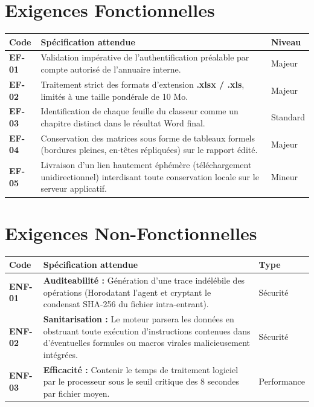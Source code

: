 \documentclass[12pt,a4paper,oneside]{report}
\begin{document}
\section{Exigences Fonctionnelles}

\begin{table}[H]
\centering
\begin{tabular}{L{2cm} L{10cm} L{2cm}}
\toprule
\textbf{Code} & \textbf{Spécification attendue} & \textbf{Niveau} \\
\midrule
\textbf{EF-01} & Validation impérative de l'authentification préalable par compte autorisé de l'annuaire interne. & Majeur \\
\textbf{EF-02} & Traitement strict des formats d'extension \textbf{.xlsx / .xls}, limités à une taille pondérale de 10 Mo. & Majeur \\
\textbf{EF-03} & Identification de chaque feuille du classeur comme un chapitre distinct dans le résultat Word final. & Standard \\
\textbf{EF-04} & Conservation des matrices sous forme de tableaux formels (bordures pleines, en-têtes répliquées) sur le rapport édité. & Majeur \\
\textbf{EF-05} & Livraison d'un lien hautement éphémère (téléchargement unidirectionnel) interdisant toute conservation locale sur le serveur applicatif. & Mineur \\
\bottomrule
\end{tabular}
\end{table}

\section{Exigences Non-Fonctionnelles}

\begin{table}[H]
\centering
\begin{tabular}{L{2cm} L{10cm} L{2cm}}
\toprule
\textbf{Code} & \textbf{Spécification attendue} & \textbf{Type} \\
\midrule
\textbf{ENF-01} & \textbf{Auditeabilité : } Génération d'une trace indélébile des opérations (Horodatant l'agent et cryptant le condensat SHA-256 du fichier intra-entrant). & Sécurité \\
\textbf{ENF-02} & \textbf{Sanitarisation :} Le moteur parsera les données en obstruant toute exécution d'instructions contenues dans d'éventuelles formules ou macros virales malicieusement intégrées. & Sécurité \\
\textbf{ENF-03} & \textbf{Efficacité :} Contenir le temps de traitement logiciel par le processeur sous le seuil critique des 8 secondes par fichier moyen. & Performance \\
\bottomrule
\end{tabular}
\end{table}
\end{document}
